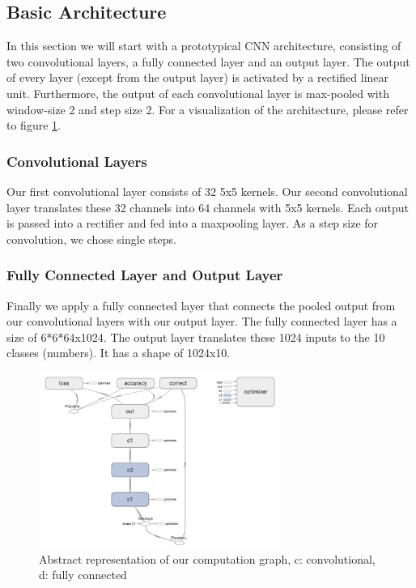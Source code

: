\documentclass{article}
\begin{document}
\subsection{Basic Architecture}
In this section we will start with a prototypical CNN architecture, consisting of two convolutional layers, a fully connected layer and an output layer. The output of every layer (except from the output layer) is activated by a rectified linear unit. Furthermore, the output of each convolutional layer is max-pooled with window-size 2 and step size 2. For a visualization of the architecture, please refer to figure \ref{std_graph}.

\subsubsection*{Convolutional Layers}
Our first convolutional layer consists of 32 5x5 kernels. Our second convolutional layer translates these 32 channels into 64 channels with 5x5 kernels. Each output is passed into a rectifier and fed into a maxpooling layer. As a step size for convolution, we chose single steps.

\subsubsection*{Fully Connected Layer and Output Layer}
Finally we apply a fully connected layer that connects the pooled output from our convolutional layers with our output layer. The fully connected layer has a size of 6*6*64x1024. The output layer translates these 1024 inputs to the 10 classes (numbers). It has a shape of 1024x10.

\begin{figure}
\centering
\includegraphics[width=0.7\textwidth]{imgs/std_graph.png}
\caption{Abstract representation of our computation graph, c: convolutional, d: fully connected}\label{std_graph}
\end{figure}
\end{document}
